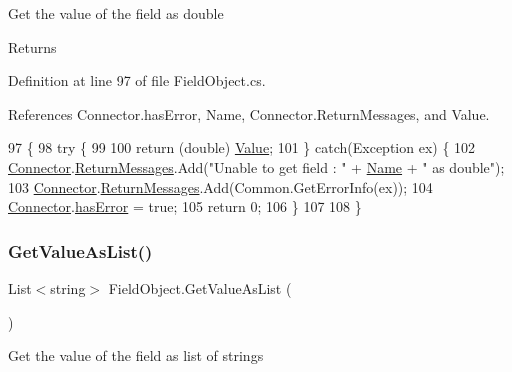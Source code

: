 Get the value of the field as double 

\begin{DoxyReturn}{Returns}

\end{DoxyReturn}


Definition at line 97 of file Field\+Object.\+cs.



References Connector.\+has\+Error, Name, Connector.\+Return\+Messages, and Value.


\begin{DoxyCode}
97                                      \{
98         \textcolor{keywordflow}{try} \{
99 
100             \textcolor{keywordflow}{return} (\textcolor{keywordtype}{double}) \mbox{\hyperlink{class_field_object_a9764fb1824cec95b82cd6ac0b4cd8919}{Value}};
101         \} \textcolor{keywordflow}{catch}(Exception ex) \{
102             \mbox{\hyperlink{class_connector}{Connector}}.\mbox{\hyperlink{class_connector_a1ed422674b344524fd77998dcf6a9ba6}{ReturnMessages}}.Add(\textcolor{stringliteral}{"Unable to get field : "} + 
      \mbox{\hyperlink{class_field_object_ae5d972e96a3eca93407da8e8a89abfd1}{Name}} + \textcolor{stringliteral}{" as double"});
103             \mbox{\hyperlink{class_connector}{Connector}}.\mbox{\hyperlink{class_connector_a1ed422674b344524fd77998dcf6a9ba6}{ReturnMessages}}.Add(Common.GetErrorInfo(ex));
104             \mbox{\hyperlink{class_connector}{Connector}}.\mbox{\hyperlink{class_connector_a079bae21a5417efa53bfe8954c0f533f}{hasError}} = \textcolor{keyword}{true};
105             \textcolor{keywordflow}{return} 0;
106         \}
107        
108     \}
\end{DoxyCode}
\mbox{\label{class_field_object_a635d7598cbf7bbc29821cb1c012de964}} 
\subsubsection{\texorpdfstring{Get\+Value\+As\+List()}{GetValueAsList()}}
{\footnotesize\ttfamily List$<$string$>$ Field\+Object.\+Get\+Value\+As\+List (\begin{DoxyParamCaption}{ }\end{DoxyParamCaption})}



Get the value of the field as list of strings 


